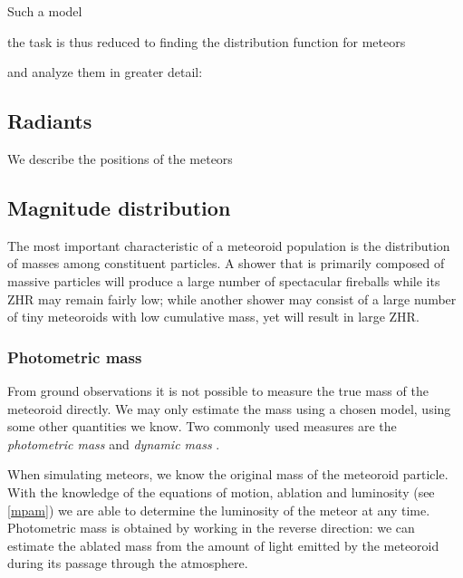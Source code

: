     Such a model 

    the task is thus reduced to finding the distribution function for meteors

    and analyze them in greater detail:


    \subsection{Radiants} \label{msr}
        We describe the positions of the meteors


    

    \subsection{Magnitude distribution} \label{msm}
        The most important characteristic of a meteoroid population is the distribution of masses
        among constituent particles. A shower that is primarily composed of massive particles
        will produce a large number of spectacular fireballs while its ZHR may remain fairly low;
        while another shower may consist of a large number of tiny meteoroids with low cumulative mass,
        yet will result in large ZHR.

       
        \subsubsection{Photometric mass} \label{msmp}
            From ground observations it is not possible to measure the true mass of the meteoroid directly.
            We may only estimate the mass using a chosen model, using some other quantities we know.
            Two commonly used measures are the \emph{photometric mass} and \emph{dynamic mass} \citep{ceplecha1966}.

            When simulating meteors, we know the original mass of the meteoroid particle.
            With the knowledge of the equations of motion, ablation and luminosity (see \cref{mpam})
            we are able to determine the luminosity of the meteor at any time.
            Photometric mass is obtained by working in the reverse direction: we can estimate the
            ablated mass from the amount of light emitted by the meteoroid during its passage through the atmosphere.

